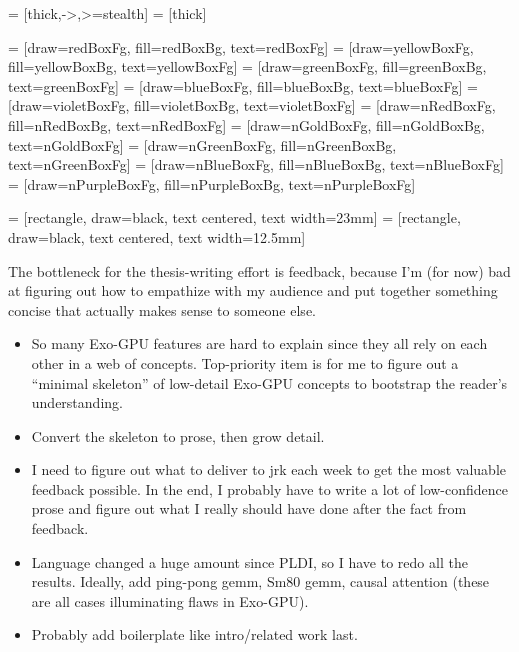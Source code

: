 

 = [thick,->,>=stealth]
 = [thick]

 = [draw=redBoxFg, fill=redBoxBg, text=redBoxFg]
 = [draw=yellowBoxFg, fill=yellowBoxBg, text=yellowBoxFg]
 = [draw=greenBoxFg, fill=greenBoxBg, text=greenBoxFg]
 = [draw=blueBoxFg, fill=blueBoxBg, text=blueBoxFg]
 = [draw=violetBoxFg, fill=violetBoxBg, text=violetBoxFg]
 = [draw=nRedBoxFg, fill=nRedBoxBg, text=nRedBoxFg]
 = [draw=nGoldBoxFg, fill=nGoldBoxBg, text=nGoldBoxFg]
 = [draw=nGreenBoxFg, fill=nGreenBoxBg, text=nGreenBoxFg]
 = [draw=nBlueBoxFg, fill=nBlueBoxBg, text=nBlueBoxFg]
 = [draw=nPurpleBoxFg, fill=nPurpleBoxBg, text=nPurpleBoxFg]

 = [rectangle, draw=black, text centered, text width=23mm]
 = [rectangle, draw=black, text centered, text width=12.5mm]

\newcommand{\qc}[1]{\left\llbracket#1\right\rrbracket}




The bottleneck for the thesis-writing effort is feedback, because I'm (for now) bad at figuring out how to empathize with my audience and put together something concise that actually makes sense to someone else.

\begin{itemize}

\item So many Exo-GPU features are hard to explain since they all rely on each other in a web of concepts.
Top-priority item is for me to figure out a ``minimal skeleton'' of low-detail Exo-GPU concepts to bootstrap the reader's understanding.

\item Convert the skeleton to prose, then grow detail.

\item I need to figure out what to deliver to jrk each week to get the most valuable feedback possible.
In the end, I probably have to write a lot of low-confidence prose and figure out what I really should have done after the fact from feedback.

\item Language changed a huge amount since PLDI, so I have to redo all the results.
Ideally, add ping-pong gemm, Sm80 gemm, causal attention (these are all cases illuminating flaws in Exo-GPU).

\item Probably add boilerplate like intro/related work last.

\end{itemize}

